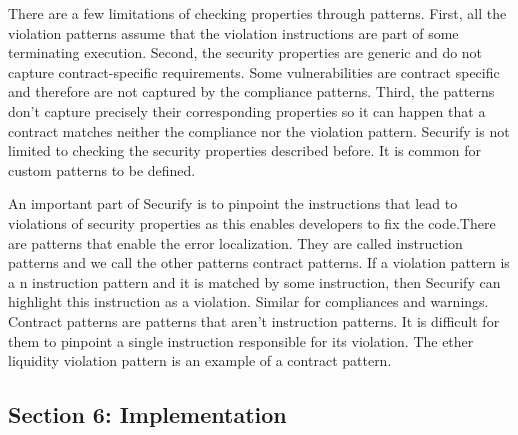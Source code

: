 \documentclass{article}
\begin{document}
There are a few limitations of checking properties through patterns. First, all the violation patterns assume that the violation instructions are part of some terminating execution. Second, the security properties are generic and do not capture contract-specific requirements. Some vulnerabilities are contract specific  and therefore are not captured by the compliance patterns. Third, the patterns don't capture precisely their corresponding properties so it can happen that a contract matches neither the compliance nor the violation pattern. Securify is not limited to checking the security properties described before. It is common for custom patterns to be defined.

An important part of Securify is to pinpoint the instructions that lead to violations of security properties as this enables developers to fix the code.There are patterns that enable the error localization. They are called instruction patterns and we call the other patterns contract patterns. If a violation pattern is a n instruction pattern and it is matched by some instruction, then Securify can highlight this instruction as a violation. Similar for compliances and warnings. Contract patterns are patterns that aren't instruction patterns. It is difficult for them to pinpoint a single instruction responsible for its violation. The ether liquidity violation pattern is an example of a contract pattern.

\subsection{Section 6: Implementation}
\end{document}
